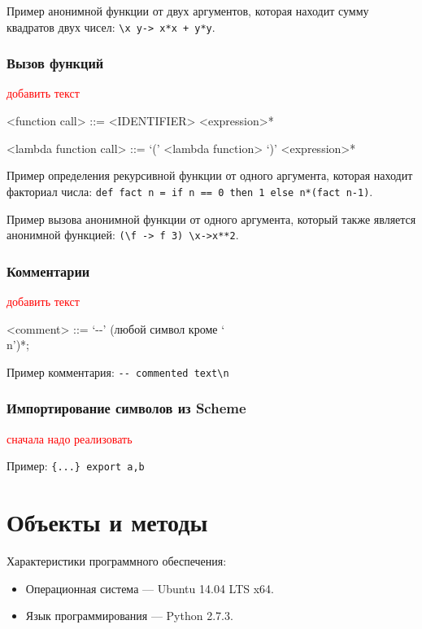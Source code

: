 \documentclass[12pt,a4paper,oneside]{extarticle}
\begin{document}
            Пример анонимной функции от двух аргументов, которая находит сумму квадратов двух чисел: \lstinline$\x y-> x*x + y*y$.

        \subsubsection{Вызов функций}
            \textcolor{red}{добавить текст}

            \begin{grammar}
                <function call> ::= <IDENTIFIER> <expression>*

                <lambda function call> ::= `(' <lambda function> `)' <expression>*
            \end{grammar}

            Пример определения рекурсивной функции от одного аргумента, которая находит факториал числа: \lstinline$def fact n = if n == 0 then 1 else n*(fact n-1)$.

            Пример вызова анонимной функции от одного аргумента, который также является анонимной функцией: \lstinline$(\f -> f 3) \x->x**2$.

        \subsubsection{Комментарии}
            \textcolor{red}{добавить текст}

            \begin{grammar}
                <comment> ::= `-\null-' (любой символ кроме `\\n')*;
            \end{grammar}

            Пример комментария: \lstinline$-- commented text\n$
            

        \subsubsection{Импортирование символов из Scheme}
            \textcolor{red}{сначала надо реализовать}

            Пример: \lstinline${...} export a,b$
        
\clearpage

\section{Объекты и методы}
\label{sec:configuration} 
        \noindent Характеристики программного обеспечения:
        \begin{itemize}
            \item Операционная система --- Ubuntu 14.04 LTS x64.
            \item Язык программирования --- Python 2.7.3.
        \end{itemize}
        
\end{document}
